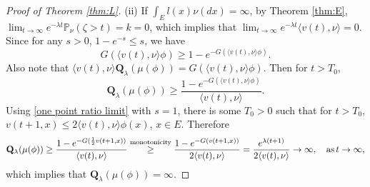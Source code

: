 \documentclass[12pt,a4paper]{amsart}
\numberwithin{equation}{section}
\theoremstyle{plain}
\theoremstyle{definition}
\theoremstyle{remark}
\begin{document}
\begin{proof}[Proof of Theorem \ref{thm:L}]
(ii) If $\int_El(x)\nu(dx)=\infty$,
by Theorem \ref{thm:E}, $\lim_{t\to\infty}e^{-\lambda t}\mathbb P_\nu(\zeta>t)=k=0$, which implies that
 $\lim_{t\to\infty}e^{-\lambda t}\langle v(t),\nu\rangle=0$.  Since for any $s>0$,  $1-e^{-s}\leq s$, we have
$$G(\langle v(t),\nu\rangle\phi)\geq 1-e^{-G(\langle v(t),\nu\rangle\phi)}.$$
Also note that $\langle v(t),\nu\rangle\mathbf Q_\lambda(\mu(\phi))=G(\langle v(t),\nu\rangle\phi).$
Then  for $t>T_0$,
\[
\mathbf Q_\lambda(\mu(\phi))\geq \dfrac{1-e^{-G(\langle v(t),\nu\rangle\phi)}}{\langle v(t),\nu\rangle}.
\]
 Using \eqref{one point ratio limit} with $s=1$,
 there is some $T_0>0$ such that for $t>T_0$, $v(t+1,x)\leq 2\langle v(t),\nu\rangle\phi(x)$, $x\in E$.
 Therefore
 \[
\mathbf Q_\lambda(\mu(\phi))\geq \dfrac{1-e^{-G(\frac{1}{2}v(t+1,x))}}{\langle v(t),\nu\rangle}\overset{\text{monotonicity}}\geq
\dfrac{1-e^{-G(v(t+1,x))}}{2\langle v(t),\nu\rangle}
=\dfrac{e^{\lambda(t+1)}}{2\langle v(t),\nu\rangle}\to\infty, \quad {\rm as}\, t\to\infty,
\]
which implies that $\mathbf Q_\lambda(\mu(\phi))=\infty$.
\end{proof}
\end{document}
